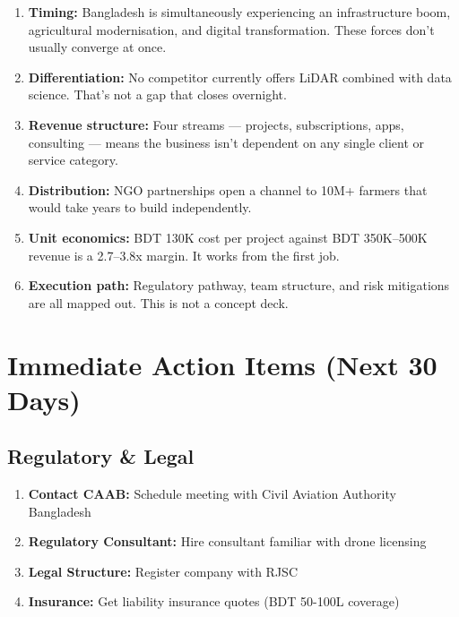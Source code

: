 \begin{enumerate}
    \item \textbf{Timing:} Bangladesh is simultaneously experiencing an infrastructure boom, agricultural modernisation, and digital transformation. These forces don't usually converge at once.

    \item \textbf{Differentiation:} No competitor currently offers LiDAR combined with data science. That's not a gap that closes overnight.

    \item \textbf{Revenue structure:} Four streams --- projects, subscriptions, apps, consulting --- means the business isn't dependent on any single client or service category.

    \item \textbf{Distribution:} NGO partnerships open a channel to 10M+ farmers that would take years to build independently.

    \item \textbf{Unit economics:} BDT 130K cost per project against BDT 350K--500K revenue is a 2.7--3.8x margin. It works from the first job.

    \item \textbf{Execution path:} Regulatory pathway, team structure, and risk mitigations are all mapped out. This is not a concept deck.
\end{enumerate}

\section{Immediate Action Items (Next 30 Days)}

\subsection{Regulatory \& Legal}

\begin{enumerate}
    \item [\checkmark] \textbf{Contact CAAB:} Schedule meeting with Civil Aviation Authority Bangladesh
    \item [\checkmark] \textbf{Regulatory Consultant:} Hire consultant familiar with drone licensing
    \item [\checkmark] \textbf{Legal Structure:} Register company with RJSC
    \item [\checkmark] \textbf{Insurance:} Get liability insurance quotes (BDT 50-100L coverage)
\end{enumerate}

